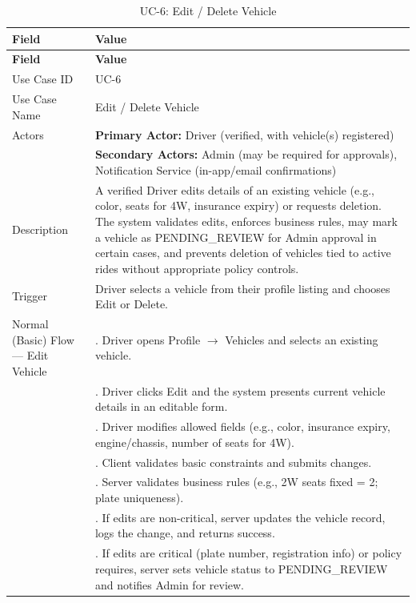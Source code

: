 \begin{longtable}{|>{\raggedright\arraybackslash}p{4cm}|>{\raggedright\arraybackslash}p{11cm}|}
\caption{UC-6: Edit / Delete Vehicle}
\label{tab:uc-6} \\
\hline
\rowcolor{lightgray!30}
\textbf{Field} & \textbf{Value} \\
\hline
\endfirsthead
\hline
\rowcolor{lightgray!30}
\textbf{Field} & \textbf{Value} \\
\hline
\endhead
\hline
\endfoot
\hline
\endlastfoot
Use Case ID & UC-6 \\
\hline
Use Case Name & Edit / Delete Vehicle \\
\hline
Actors & \textbf{Primary Actor:} Driver (verified, with vehicle(s) registered) \\
& \textbf{Secondary Actors:} Admin (may be required for approvals), Notification Service (in-app/email confirmations) \\
\hline
Description & A verified Driver edits details of an existing vehicle (e.g., color, seats for 4W, insurance expiry) or requests deletion. The system validates edits, enforces business rules, may mark a vehicle as PENDING\_REVIEW for Admin approval in certain cases, and prevents deletion of vehicles tied to active rides without appropriate policy controls. \\
\hline
Trigger & Driver selects a vehicle from their profile listing and chooses Edit or Delete. \\
\hline
Normal (Basic) Flow --- Edit Vehicle & 1. Driver opens Profile $\rightarrow$ Vehicles and selects an existing vehicle. \\
& 2. Driver clicks Edit and the system presents current vehicle details in an editable form. \\
& 3. Driver modifies allowed fields (e.g., color, insurance expiry, engine/chassis, number of seats for 4W). \\
& 4. Client validates basic constraints and submits changes. \\
& 5. Server validates business rules (e.g., 2W seats fixed = 2; plate uniqueness). \\
& 6. If edits are non-critical, server updates the vehicle record, logs the change, and returns success. \\
& 7. If edits are critical (plate number, registration info) or policy requires, server sets vehicle status to PENDING\_REVIEW and notifies Admin for review. \\

\end{longtable}
